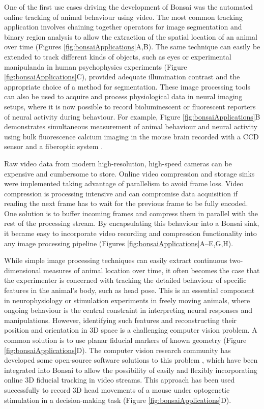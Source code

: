 One of the first use cases driving the development of Bonsai was the automated online tracking of animal behaviour using video. The most common tracking application involves chaining together operators for image segmentation and binary region analysis to allow the extraction of the spatial location of an animal over time (Figures \ref{fig:bonsaiApplications}A,B). The same technique can easily be extended to track different kinds of objects, such as eyes or experimental manipulanda in human psychophysics experiments (Figure \ref{fig:bonsaiApplications}C), provided adequate illumination contrast and the appropriate choice of a method for segmentation. These image processing tools can also be used to acquire and process physiological data in neural imaging setups, where it is now possible to record bioluminescent or fluorescent reporters of neural activity during behaviour. For example, Figure \ref{fig:bonsaiApplications}B demonstrates simultaneous measurement of animal behaviour and neural activity using bulk fluorescence calcium imaging in the mouse brain recorded with a CCD sensor and a fiberoptic system \cite{Tecuapetla2014}.

Raw video data from modern high-resolution, high-speed cameras can be expensive and cumbersome to store. Online video compression and storage sinks were implemented taking advantage of parallelism to avoid frame loss. Video compression is processing intensive and can compromise data acquisition if reading the next frame has to wait for the previous frame to be fully encoded. One solution is to buffer incoming frames and compress them in parallel with the rest of the processing stream. By encapsulating this behaviour into a Bonsai sink, it became easy to incorporate video recording and compression functionality into any image processing pipeline (Figures \ref{fig:bonsaiApplications}A–E,G,H).

While simple image processing techniques can easily extract continuous two-dimensional measures of animal location over time, it often becomes the case that the experimenter is concerned with tracking the detailed behaviour of specific features in the animal's body, such as head pose. This is an essential component in neurophysiology or stimulation experiments in freely moving animals, where ongoing behaviour is the central constraint in interpreting neural responses and manipulations. However, identifying such features and reconstructing their position and orientation in 3D space is a challenging computer vision problem. A common solution is to use planar fiducial markers of known geometry \cite{Kato1999, Garrido-Jurado2014} (Figure \ref{fig:bonsaiApplications}D). The computer vision research community has developed some open-source software solutions to this problem \cite{Garrido-Jurado2014}, which have been integrated into Bonsai to allow the possibility of easily and flexibly incorporating online 3D fiducial tracking in video streams. This approach has been used successfully to record 3D head movements of a mouse under optogenetic stimulation in a decision-making task (Figure \ref{fig:bonsaiApplications}D).

